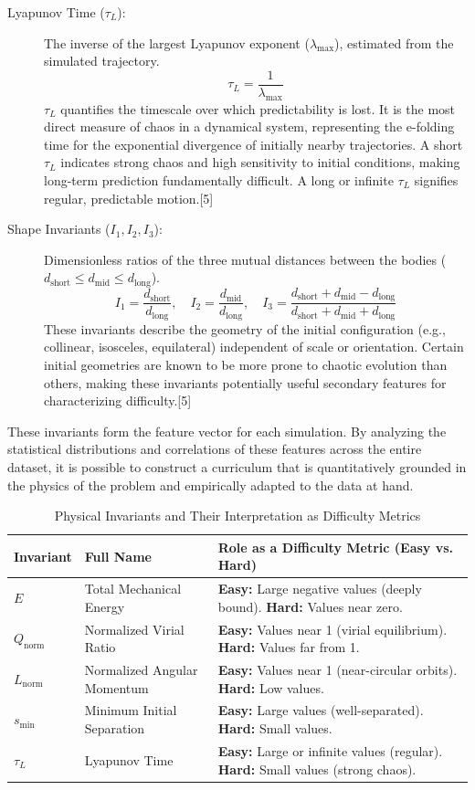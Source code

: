 \begin{description}
    \item[Lyapunov Time ($\tau_L$):] The inverse of the largest Lyapunov exponent ($\lambda_{\text{max}}$), estimated from the simulated trajectory.
    $$\tau_{L} = \frac{1}{\lambda_{\text{max}}}$$
    $\tau_{L}$ quantifies the timescale over which predictability is lost. It is the most direct measure of chaos in a dynamical system, representing the e-folding time for the exponential divergence of initially nearby trajectories. A short $\tau_{L}$ indicates strong chaos and high sensitivity to initial conditions, making long-term prediction fundamentally difficult. A long or infinite $\tau_{L}$ signifies regular, predictable motion.[5]

    \item[Shape Invariants ($I_1, I_2, I_3$):] Dimensionless ratios of the three mutual distances between the bodies ($d_{\text{short}} \le d_{\text{mid}} \le d_{\text{long}}$).
    $$I_{1}=\frac{d_{\text{short}}}{d_{\text{long}}}, \quad I_{2}=\frac{d_{\text{mid}}}{d_{\text{long}}}, \quad I_{3}=\frac{d_{\text{short}}+d_{\text{mid}}-d_{\text{long}}}{d_{\text{short}}+d_{\text{mid}}+d_{\text{long}}}$$
    These invariants describe the geometry of the initial configuration (e.g., collinear, isosceles, equilateral) independent of scale or orientation. Certain initial geometries are known to be more prone to chaotic evolution than others, making these invariants potentially useful secondary features for characterizing difficulty.[5]
\end{description}

These invariants form the feature vector for each simulation. By analyzing the statistical distributions and correlations of these features across the entire dataset, it is possible to construct a curriculum that is quantitatively grounded in the physics of the problem and empirically adapted to the data at hand.

\begin{table}[H]
\centering
\caption{Physical Invariants and Their Interpretation as Difficulty Metrics}
\label{tab:invariants}
\begin{tabular}{@{}p{2cm}p{4cm}p{7cm}@{}}
\toprule
\textbf{Invariant} & \textbf{Full Name} & \textbf{Role as a Difficulty Metric (Easy vs. Hard)} \\ \midrule
$E$ & Total Mechanical Energy & \textbf{Easy:} Large negative values (deeply bound). \textbf{Hard:} Values near zero. \\
$Q_{\text{norm}}$ & Normalized Virial Ratio & \textbf{Easy:} Values near 1 (virial equilibrium). \textbf{Hard:} Values far from 1. \\
$L_{\text{norm}}$ & Normalized Angular Momentum & \textbf{Easy:} Values near 1 (near-circular orbits). \textbf{Hard:} Low values. \\
$s_{\text{min}}$ & Minimum Initial Separation & \textbf{Easy:} Large values (well-separated). \textbf{Hard:} Small values. \\
$\tau_{L}$ & Lyapunov Time & \textbf{Easy:} Large or infinite values (regular). \textbf{Hard:} Small values (strong chaos). \\ \bottomrule
\end{tabular}
\end{table}

